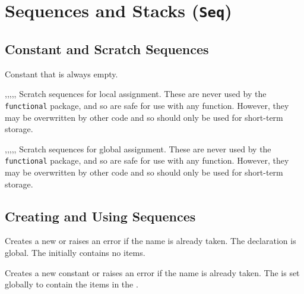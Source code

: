 \documentclass[oneside]{book}
\begin{document}
\chapter{Sequences and Stacks (\texttt{Seq})}

\section{Constant and Scratch Sequences}

\begin{variable}{\cEmptySeq}
Constant that is always empty.
\end{variable}

\begin{variable}{\lTmpaSeq,\lTmpbSeq,\lTmpcSeq,\lTmpiSeq,\lTmpjSeq,\lTmpkSeq}
Scratch sequences for local assignment. These are never used by
the \verb!functional! package, and so are safe for use with any
function. However, they may be overwritten by other
code and so should only be used for short-term storage.
\end{variable}

\begin{variable}{\gTmpaSeq,\gTmpbSeq,\gTmpcSeq,\gTmpiSeq,\gTmpjSeq,\gTmpkSeq}
Scratch sequences for global assignment. These are never used by
the \verb!functional! package, and so are safe for use with any
function. However, they may be overwritten by other
code and so should only be used for short-term storage.
\end{variable}

\section{Creating and Using Sequences}

\begin{function}{\SeqNew}
\begin{syntax}
 
\end{syntax}
Creates a new  or raises an error if the name is
already taken. The declaration is global. The 
initially contains no items.
\begin{codehigh}
\SeqNew \lFooSomeSeq
\end{codehigh}
\end{function}

\begin{function}{\SeqConstFromClist}
\begin{syntax}
  
\end{syntax}
Creates a new constant  or raises an error if the name
is already taken. The  is set globally to contain the
items in the .
\begin{codehigh}
\SeqConstFromClist {}
\end{codehigh}
\end{function}
\end{document}
